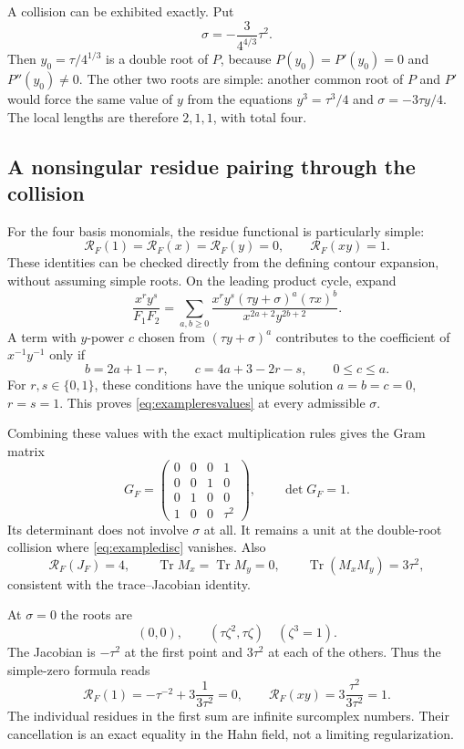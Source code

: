 \documentclass[11pt,letterpaper]{article}
\theoremstyle{definition}
\theoremstyle{remark}
\newcommand{\Tr}{\operatorname{Tr}}
\newcommand{\RR}{\mathcal R}
\begin{document}
A collision can be exhibited exactly. Put
\[
 \sigma=-\frac{3}{4^{4/3}}\tau^2.
\]
Then $y_0=\tau/4^{1/3}$ is a double root of $P$, because $P(y_0)=P'(y_0)=0$ and $P''(y_0)\ne0$. The other two roots are simple: another common root of $P$ and $P'$ would force the same value of $y$ from the equations $y^3=\tau^3/4$ and $\sigma=-3\tau y/4$. The local lengths are therefore $2,1,1$, with total four.

\subsection{A nonsingular residue pairing through the collision}
For the four basis monomials, the residue functional is particularly simple:
\begin{equation}\label{eq:exampleresvalues}
 \RR_F(1)=\RR_F(x)=\RR_F(y)=0,
 \qquad \RR_F(xy)=1.
\end{equation}
These identities can be checked directly from the defining contour expansion, without assuming simple roots. On the leading product cycle, expand
\[
 \frac{x^r y^s}{F_1F_2}
 =\sum_{a,b\geq0}
   \frac{x^r y^s(\tau y+\sigma)^a(\tau x)^b}
        {x^{2a+2}y^{2b+2}}.
\]
A term with $y$-power $c$ chosen from $(\tau y+\sigma)^a$ contributes to the coefficient of $x^{-1}y^{-1}$ only if
\[
 b=2a+1-r,\qquad c=4a+3-2r-s,\qquad 0\leq c\leq a.
\]
For $r,s\in\{0,1\}$, these conditions have the unique solution $a=b=c=0$, $r=s=1$. This proves \eqref{eq:exampleresvalues} at every admissible $\sigma$.

Combining these values with the exact multiplication rules gives the Gram matrix
\begin{equation}\label{eq:examplegram}
 G_F=\begin{pmatrix}
 0&0&0&1\\
 0&0&1&0\\
 0&1&0&0\\
 1&0&0&\tau^2
 \end{pmatrix},\qquad \det G_F=1.
\end{equation}
Its determinant does not involve $\sigma$ at all. It remains a unit at the double-root collision where \eqref{eq:exampledisc} vanishes. Also
\[
 \RR_F(J_F)=4,\qquad
 \Tr M_x=\Tr M_y=0,\qquad
 \Tr(M_xM_y)=3\tau^2,
\]
consistent with the trace--Jacobian identity.

At $\sigma=0$ the roots are
\[
 (0,0),\qquad (\tau\zeta^2,\tau\zeta)\quad(\zeta^3=1).
\]
The Jacobian is $-\tau^2$ at the first point and $3\tau^2$ at each of the others. Thus the simple-zero formula reads
\begin{equation}\label{eq:infiniterescancel}
 \RR_F(1)=-\tau^{-2}+3\frac{1}{3\tau^2}=0,
 \qquad
 \RR_F(xy)=3\frac{\tau^2}{3\tau^2}=1.
\end{equation}
The individual residues in the first sum are infinite surcomplex numbers. Their cancellation is an exact equality in the Hahn field, not a limiting regularization.
\end{document}

